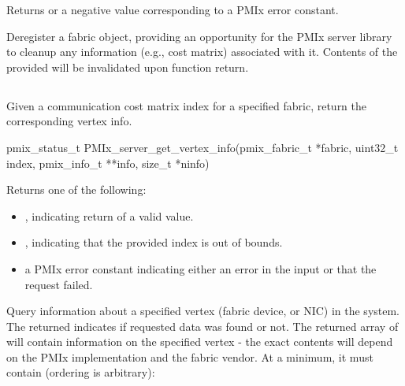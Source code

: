 Returns  or a negative value corresponding to a \ac{PMIx} error constant.

\descr

Deregister a fabric object, providing an opportunity for the \ac{PMIx} server library to cleanup any information (e.g., cost matrix) associated with it. Contents of the provided  will be invalidated upon function return.


\subsection{}

\summary

Given a communication cost matrix index for a specified fabric, return the corresponding vertex info.

\format

\cspecificstart
\begin{codepar}
pmix_status_t
PMIx_server_get_vertex_info(pmix_fabric_t *fabric, uint32_t index,
                            pmix_info_t **info, size_t *ninfo)
\end{codepar}
\cspecificend

\begin{arglist}
\end{arglist}

Returns one of the following:

\begin{itemize}
    \item {}, indicating return of a valid value.
    \item {}, indicating that the provided index is out of bounds.
    \item a \ac{PMIx} error constant indicating either an error in the input or that the request failed.
\end{itemize}

\descr

Query information about a specified vertex (fabric device, or \ac{NIC}) in the system. The returned  indicates if requested data was found or not. The returned array of  will contain information on the specified vertex - the exact contents will depend on the \ac{PMIx} implementation and the fabric vendor. At a minimum, it must contain (ordering is arbitrary):

